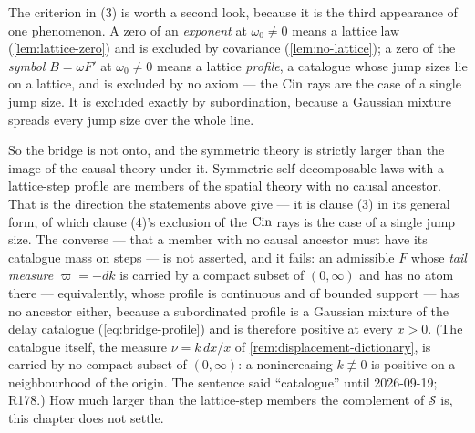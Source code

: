 The criterion in (3) is worth a second look, because it is the third appearance of one
phenomenon. A zero of an \emph{exponent} at $\omega_0 \ne 0$ means a lattice law
(\ref{lem:lattice-zero}) and is excluded by covariance (\ref{lem:no-lattice}); a zero of the
\emph{symbol} $B = \omega F'$ at $\omega_0 \ne 0$ means a lattice \emph{profile}, a catalogue
whose jump sizes lie on a lattice, and is excluded by no axiom --- the $\operatorname{Cin}$ rays are the case
of a single jump size. It is excluded exactly by subordination, because a Gaussian mixture
spreads every jump size over the whole line.

So the bridge is not onto, and the symmetric theory is strictly larger than the image of the
causal theory under it.
Symmetric self-decomposable laws with a lattice-step profile are members of the
spatial theory with no causal ancestor. That is the direction the statements above give --- it is
clause (3) in its general form, of which clause (4)'s exclusion of the $\operatorname{Cin}$ rays is the case of a
single jump size. The
converse --- that a member with no causal ancestor must have its catalogue mass on steps --- is
not asserted, and it fails: an admissible $F$ whose \emph{tail measure} $\varpi = -dk$ is carried
by a compact subset of $(0,\infty)$ and has no atom there --- equivalently, whose profile is
continuous and of bounded support --- has no ancestor either, because a subordinated
profile is a Gaussian mixture of the delay catalogue (\ref{eq:bridge-profile}) and is therefore
positive at every $x > 0$. (The catalogue itself, the \Levy{} measure $\nu = k\,dx/x$ of
\ref{rem:displacement-dictionary}, is carried by no compact subset of $(0,\infty)$: a
nonincreasing $k \not\equiv 0$ is positive on a neighbourhood of the origin. The sentence said
``catalogue'' until 2026-09-19; R178.) How much larger than the lattice-step members the complement of
$\mathcal{S}$ is, this chapter does not settle.

